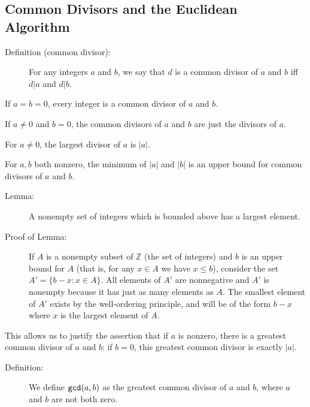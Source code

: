 \documentclass[12pt]{article}
\begin{document}
\subsection{Common Divisors and the Euclidean Algorithm}

\begin{description}

\item[Definition (common divisor):]  For any integers $a$ and $b$, we say that $d$ is a common divisor of $a$ and $b$ iff $d|a$ and $d|b$.

\end{description}

If $a=b=0$, every integer is a common divisor of $a$ and $b$.

If $a \neq 0$ and $b=0$, the common divisors of $a$ and $b$ are just the divisors of $a$.

For $a \neq 0$, the largest divisor of $a$ is $|a|$.

For $a,b$ both nonzero, the minimum of $|a|$ and $|b|$ is an upper bound for common divisors of $a$ and $b$.

\begin{description}

\item[Lemma:]  A nonempty set of integers which is bounded above has a largest element. 

\item[Proof of Lemma:]
If $A$ is a nonempty subset of $\mathbb Z$ (the set of integers) and $b$ is an upper bound for $A$ (that is, for any $x \in A$ we have $x \leq b$), consider the set $A' = \{b-x : x \in A\}$.   All elements of $A'$ are nonnegative
and $A'$ is nonempty because it has just as many elements as $A$.   The smallest element of $A'$ exists by the well-ordering principle, and will be of the form $b-x$ where $x$ is the largest element of $A$.

\end{description}

This allows us to justify the assertion that if $a$ is nonzero, there is a greatest common divisor of $a$ and $b$:
if $b=0$, this greatest common divisor is  exactly $|a|$.  

\begin{description}

\item[Definition:]  We define ${\tt gcd}(a,b)$ as the greatest common divisor of $a$ and $b$, where $a$ and $b$ are not both zero.

\end{description}
\end{document}
